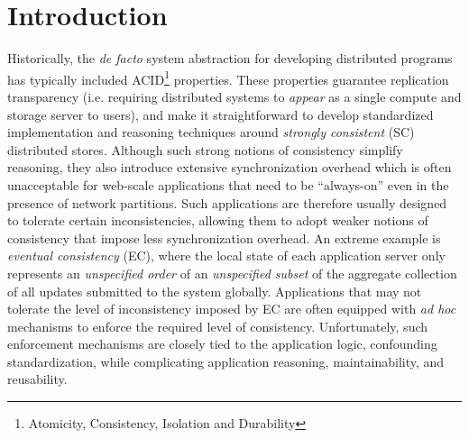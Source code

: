 \section{Introduction}
\label{sec:intro}

Historically, the \emph{de facto} system abstraction for developing
distributed programs has typically included ACID\footnote{Atomicity,
Consistency, Isolation and Durability} properties.  These properties
guarantee replication transparency (i.e. requiring distributed systems
to \emph{appear} as a single compute and storage server to users), and
make it straightforward to develop standardized implementation and
reasoning techniques around \emph{strongly consistent} (SC)
distributed stores.  Although such strong notions of consistency
simplify reasoning, they also introduce extensive synchronization
overhead which is often unacceptable for web-scale applications that
need to be ``always-on'' even in the presence of network partitions.
Such applications are therefore usually designed to tolerate certain
inconsistencies, allowing them to adopt weaker notions of consistency
that impose less synchronization overhead. An extreme example is
\emph{eventual consistency} (EC), where the local state of each
application server only represents an \emph{unspecified order} of an
\emph{unspecified subset} of the aggregate collection of all updates
submitted to the system globally. Applications that may not tolerate
the level of inconsistency imposed by EC are often equipped with
\emph{ad hoc} mechanisms to enforce the required level of consistency.
Unfortunately, such enforcement mechanisms are closely tied to the
application logic, confounding standardization, while complicating
application reasoning, maintainability, and reusability.


